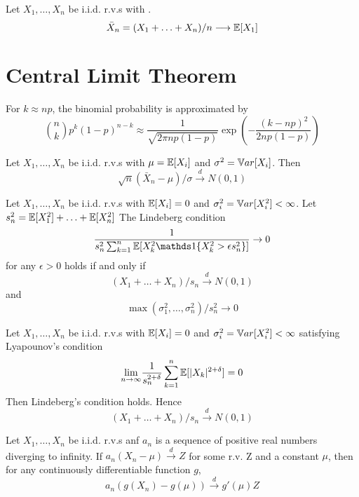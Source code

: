 \documentclass[11pt]{article}
\begin{document}
\theorem
Let $X_1, \hdots, X_n$ be i.i.d. r.v.s with .  $$\bar{X}_n = (X_1 + \hdots + X_n) / n \longrightarrow \mathbb{E}[{X_1}]$$ 

\section{Central Limit Theorem}
For $k \approx np$, the binomial probability is approximated by
$${n \choose k}p^k(1-p)^{n-k} \approx \frac{1}{\sqrt{2\pi np(1-p)}}\exp{\left ( - \frac{(k - np)^2}{2np(1-p)}\right)}$$

Let $X_1, \hdots, X_n$ be i.i.d. r.v.s with $\mu = \mathbb{E}[{X_i}]$ and $\sigma^2 = \mathbb{V}ar[{X_i}]$. Then
$$\sqrt{n}(\bar{X}_n - \mu) / \sigma \overset{d}{\longrightarrow} N(0,1)$$

Let $X_1, \hdots, X_n$ be i.i.d. r.v.s with $\mathbb{E}[{X_i}] = 0$ and $\sigma_i^2 = \mathbb{V}ar[{X_i^2}] < \infty$. Let $s_n^2 = \mathbb{E}[{X_1^2}] + \hdots + \mathbb{E}[{X_n^2}]$ The Lindeberg condition
$$\frac{1}{s_n^2 \sum_{k=1}^n \expect{X_k^2\id{X_k^2 > \epsilon s_n^2}}} \rightarrow 0$$ for any $\epsilon > 0$ holds if and only if
$$(X_1 + \hdots + X_n) /s_n \overset{d}{\longrightarrow} N(0,1)$$ and $$\max(\sigma_1^2, \hdots, \sigma_n^2)/ s_n^2 \rightarrow 0$$

Let $X_1, \hdots, X_n$ be i.i.d. r.v.s with $\mathbb{E}[{X_i}] = 0$ and $\sigma_i^2 = \mathbb{V}ar[{X_i^2}] < \infty$ satisfying Lyapounov's condition
$$\underset{n \rightarrow \infty}{\lim} \frac{1}{s_n^{2 + \delta}} \sum_{k=1}^n \mathbb{E}[{|X_k|^{2 + \delta}}] = 0$$
Then Lindeberg's condition holds. Hence $$(X_1 + \hdots + X_n) /s_n \overset{d}{\longrightarrow} N(0,1)$$


Let $X_1, \hdots, X_n$ be i.i.d. r.v.s anf $a_n$ is a sequence of positive real numbers diverging to infinity. If $a_n(X_n - \mu) \overset{d}{\longrightarrow} Z$ for some r.v. Z and a constant $\mu$, then for any continuously differentiable function $g$,
$$a_n(g(X_n) - g(\mu)) \overset{d}{\longrightarrow} g'(\mu)Z$$
\end{document}
